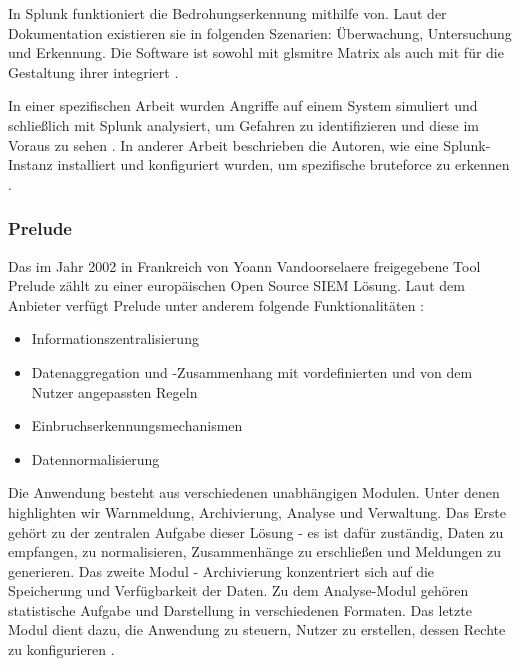 In Splunk funktioniert die Bedrohungserkennung mithilfe von. Laut der Dokumentation existieren sie in folgenden Szenarien: Überwachung, Untersuchung und Erkennung. Die Software ist sowohl mit gls{mitre} Matrix als auch mit  für die Gestaltung ihrer  integriert \citep{Splunk_usecases}. 

In einer spezifischen Arbeit wurden Angriffe auf einem System simuliert und schließlich mit Splunk analysiert, um Gefahren zu identifizieren und diese im Voraus zu sehen \citep{Su_SplunkDDOS}. In anderer Arbeit beschrieben die Autoren, wie eine Splunk-Instanz installiert und konfiguriert wurden, um spezifische \gls{bruteforce} zu erkennen \citep{Selvaganesh_SplunkBruteForce}.
 





\subsubsection{Prelude}
Das im Jahr 2002 in Frankreich von Yoann Vandoorselaere freigegebene Tool Prelude zählt zu einer europäischen \gls{Open Source} \gls{SIEM} Lösung. Laut dem Anbieter verfügt Prelude unter anderem folgende Funktionalitäten \citep{Prelude_SIEM}: 

\begin{itemize}[noitemsep]
   \item	Informationszentralisierung 
   \item	Datenaggregation und -Zusammenhang mit vordefinierten und von dem Nutzer angepassten Regeln 
   \item	Einbruchserkennungsmechanismen 
   \item	Datennormalisierung 
\end{itemize}

Die Anwendung besteht aus verschiedenen unabhängigen Modulen. Unter denen highlighten wir Warnmeldung, Archivierung, Analyse und Verwaltung. Das Erste gehört zu der zentralen Aufgabe dieser Lösung - es ist dafür zuständig, Daten zu empfangen, zu normalisieren, Zusammenhänge zu erschließen und Meldungen zu generieren. Das zweite Modul - Archivierung konzentriert sich auf die Speicherung und Verfügbarkeit der Daten. Zu dem Analyse-Modul gehören statistische Aufgabe und Darstellung in verschiedenen Formaten. Das letzte Modul dient dazu, die Anwendung zu steuern, Nutzer zu erstellen, dessen Rechte zu konfigurieren \citep{EC_Prelude}. 

